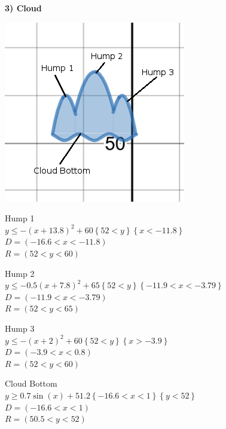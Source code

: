 \documentclass[12pt]{article}
\begin{document}
\begin{center}
\begin{large}
\textbf{3) Cloud}\\
\end{large}
\includegraphics{cloud}

{
Hump 1\\
$y\le-\left(x+13.8\right)^2+60\left\{52<y\right\}\left\{x<-11.8\right\}$\\
$D = (-16.6 < x < -11.8)$\\
$R = (52 < y < 60)$\\
\bigbreak

Hump 2\\
$y\le-0.5\left(x+7.8\right)^2+65\left\{52<y\right\}\left\{-11.9<x<-3.79\right\}$\\
$D = (-11.9 < x < -3.79)$\\
$R = (52 < y < 65)$\\
\bigbreak

Hump 3\\
$y\le-\left(x+2\right)^2+60\left\{52<y\right\}\left\{x>-3.9\right\}$\\
$D = (-3.9 < x < 0.8)$\\
$R = (52 < y < 60)$\\
\bigbreak
\clearpage

Cloud Bottom\\
$y\ge0.7\sin\left(x\right)+51.2\left\{-16.6<x<1\right\}\left\{y<52\right\}$\\
$D = (-16.6 < x < 1)$\\
$R = (50.5 < y < 52)$\\
\bigbreak
}
\end{center}
\clearpage
\end{document}
